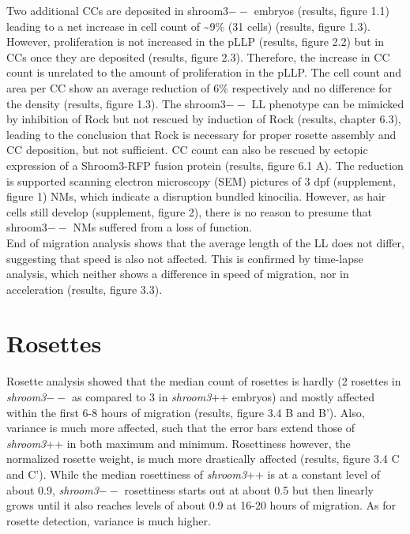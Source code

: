 \documentclass[11pt,singlespacinge,twoside]{reedthesis} %
\begin{document}
Two additional CCs are deposited in shroom3\(--\) embryos (results, figure 1.1) leading to a net increase in cell count of \textasciitilde{}9\% (31 cells) (results, figure 1.3). However, proliferation is not increased in the pLLP (results, figure 2.2) but in CCs once they are deposited (results, figure 2.3). Therefore, the increase in CC count is unrelated to the amount of proliferation in the pLLP. The cell count and area per CC show an average reduction of 6\% respectively and no difference for the density (results, figure 1.3).
The shroom3\(--\) LL phenotype can be mimicked by inhibition of Rock but not rescued by induction of Rock (results, chapter 6.3), leading to the conclusion that Rock is necessary for proper rosette assembly and CC deposition, but not sufficient. CC count can also be rescued by ectopic expression of a Shroom3-RFP fusion protein (results, figure 6.1 A).
The reduction is supported scanning electron microscopy (SEM) pictures of 3 dpf (supplement, figure 1) NMs, which indicate a disruption bundled kinocilia. However, as hair cells still develop (supplement, figure 2), there is no reason to presume that shroom3\(--\) NMs suffered from a loss of function.\\
End of migration analysis shows that the average length of the LL does not differ, suggesting that speed is also not affected. This is confirmed by time-lapse analysis, which neither shows a difference in speed of migration, nor in acceleration (results, figure 3.3).

\hypertarget{rosettes}{%
\section{Rosettes}\label{rosettes}}

Rosette analysis showed that the median count of rosettes is hardly (2 rosettes in \emph{shroom3}\(--\) as compared to 3 in \emph{shroom3}++ embryos) and mostly affected within the first 6-8 hours of migration (results, figure 3.4 B and B'). Also, variance is much more affected, such that the error bars extend those of \emph{shroom3}++ in both maximum and minimum. Rosettiness however, the normalized rosette weight, is much more drastically affected (results, figure 3.4 C and C'). While the median rosettiness of \emph{shroom3}++ is at a constant level of about 0.9, \emph{shroom3}\(--\) rosettiness starts out at about 0.5 but then linearly grows until it also reaches levels of about 0.9 at 16-20 hours of migration. As for rosette detection, variance is much higher.
\end{document}
